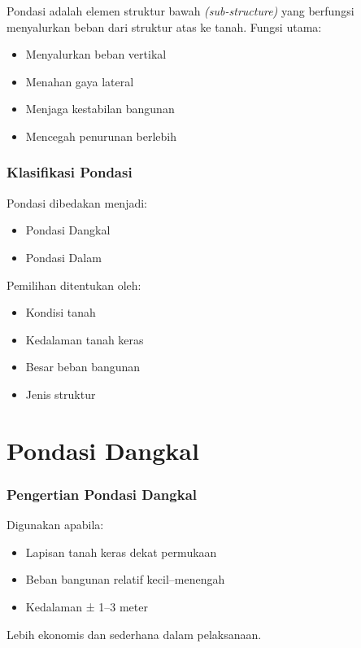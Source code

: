 \documentclass[../main.tex]{subfiles}
\begin{document}
\begin{frame}[t,mycolor=digiPH_leaf,mytitle=standard,dark]
	Pondasi adalah elemen struktur bawah \textit{(sub-structure)} yang berfungsi menyalurkan beban dari struktur atas ke tanah.
	Fungsi utama:

	\begin{itemize}
		\item Menyalurkan beban vertikal
		\item Menahan gaya lateral
		\item Menjaga kestabilan bangunan
		\item Mencegah penurunan berlebih
	\end{itemize}
\end{frame}

\begin{frame}[t,mycolor=digiPH_ocean,mytitle=center,dark]
	\frametitle{Klasifikasi Pondasi}

	Pondasi dibedakan menjadi:

	\begin{itemize}
		\item Pondasi Dangkal
		\item Pondasi Dalam
	\end{itemize}

	Pemilihan ditentukan oleh:
	\begin{itemize}
		\item Kondisi tanah
		\item Kedalaman tanah keras
		\item Besar beban bangunan
		\item Jenis struktur
	\end{itemize}


\end{frame}

\section{Pondasi Dangkal}

\begin{frame}[t,mycolor=digiPH_leaf,mytitle=standard,dark]
	\frametitle{Pengertian Pondasi Dangkal}

	Digunakan apabila:

	\begin{itemize}
		\item Lapisan tanah keras dekat permukaan
		\item Beban bangunan relatif kecil–menengah
		\item Kedalaman ± 1–3 meter
	\end{itemize}

	Lebih ekonomis dan sederhana dalam pelaksanaan.

\end{frame}
\end{document}
